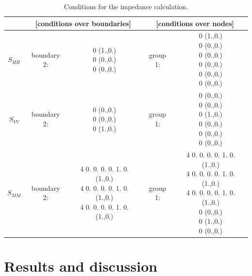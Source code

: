 \documentclass[a4]{article}
\begin{document}
\begin{table}[h]
\centering
\caption{Conditions for the impedance calculation.}
\label{tab:conditions}
\begin{tabular}{|c|c c|c c|}
	\hline
	&  \multicolumn{2}{c|}{[conditions over boundaries]} & \multicolumn{2}{c|}{[conditions over nodes]}  \\
	\hline
	$ S_{HH} $ & boundary 2: & \makecell[c]{0 (1.,0.)\\
		0 (0.,0.)\\
		0 (0.,0.)} & group 1: & \makecell[c]{0 (1.,0.)\\
		0 (0.,0.)\\
		0 (0.,0.)\\
		0 (0.,0.)\\
		0 (0.,0.)\\
		0 (0.,0.)}\\
	\hline
	$ S_{VV} $ & boundary 2: & \makecell[c]{0 (0.,0.)\\
		0 (0.,0.)\\
		0 (1.,0.)} & group 1: & \makecell[c]{0 (0.,0.)\\
		0 (0.,0.)\\
		0 (1.,0.)\\
		0 (0.,0.)\\
		0 (0.,0.)\\
		0 (0.,0.)}\\
	\hline
	$ S_{MM} $ & boundary 2: & \makecell[c]{4 0. 0. 0. 0. 1. 0. (1.,0.)\\
	                                   4 0. 0. 0. 0. 1. 0. (1.,0.)\\
	                                   4 0. 0. 0. 0. 1. 0. (1.,0.)} & group 1: & \makecell[l]{4 0. 0. 0. 0. 1. 0. (1.,0.)\\
	                                                 4 0. 0. 0. 0. 1. 0. (1.,0.)\\
	                                                 4 0. 0. 0. 0. 1. 0. (1.,0.)\\
	                                                 0 (0.,0.)\\
                                                   	 0 (1.,0.)\\
	                                                 0 (0.,0.)} \\
	\hline
\end{tabular}
\end{table}

\section{Results and discussion}
\end{document}

